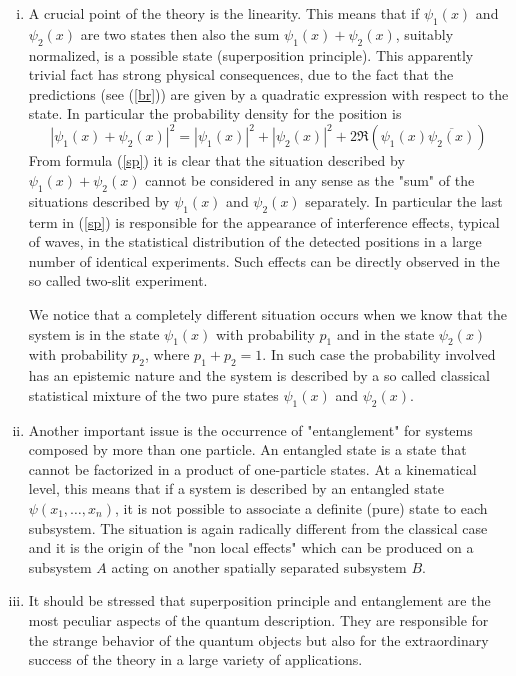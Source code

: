 \documentclass[12pt,reqno]{amsart}
\newcommand{\be}{\begin{equation}}
\newcommand{\ee}{\end{equation}}
\numberwithin{equation}{section}
\begin{document}
\begin{enumerate}[(i)]
\item  A crucial point of the theory is the linearity. This means that if $\psi_1 (x)$ and $\psi_2(x)$ are two  states then also the  sum $\psi_1(x)+\psi_2(x)$, suitably normalized, is a possible state (superposition principle). This apparently trivial fact has strong physical consequences, due to the fact that the predictions (see (\ref{br})) are given  by a quadratic expression with respect to the state. 
In particular the probability density for the position is 
\be\label{sp}
|\psi_1(x)+\psi_2(x)|^2 = |\psi_1(x)|^2 + |\psi_2 (x)|^2 + 2 \Re  \left(\psi_1 (x) \overline{\psi_2 (x)} \right)
\ee
From formula (\ref{sp}) it is clear that the situation described by $\psi_1(x)+\psi_2(x)$ cannot be considered in any sense as the "sum" of the situations described by $\psi_1 (x)$ and $\psi_2(x)$ separately. In particular the last term in (\ref{sp}) is responsible for the appearance of interference effects, typical of waves, in the statistical distribution of the detected positions in a large number of identical experiments. Such effects can be directly observed in the so called two-slit experiment. 


We notice  that a completely different situation occurs when we know that the system is in the state $\psi_1(x)$ with probability $p_1$ and in the state $\psi_2(x)$ with probability $p_2$, where $p_1 + p_2=1$. In such case the probability involved has an epistemic nature and the system is described by a so called classical statistical mixture of the two pure states $\psi_1(x)$ and $\psi_2(x)$.


\item  Another important issue  is the occurrence of "entanglement" for systems composed by more than one particle.  An entangled state is a state that cannot be factorized in a product of one-particle states. 
At a kinematical level, this means that if  a system is  described by an entangled state $\psi(x_1,\ldots,x_n)$, it is not possible to associate a definite (pure) state to each subsystem. The situation is again radically different from the classical case and it is the origin of the "non local effects" which can be produced on a subsystem $A$ acting on another spatially separated subsystem $B$.


\item  It should be stressed that superposition principle and entanglement are the most peculiar aspects of the quantum description. They are responsible for the strange behavior of the quantum objects but also for the extraordinary success of the theory in a large variety of applications. 



\end{enumerate}
\end{document}
